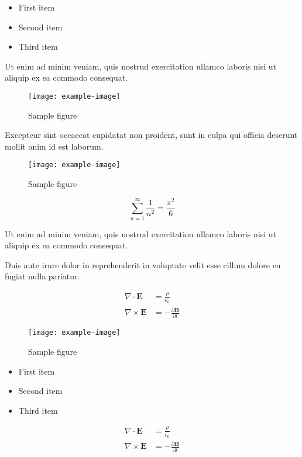 \documentclass{article}
\begin{document}
\begin{itemize}
\item First item
\item Second item
\item Third item
\end{itemize}

Ut enim ad minim veniam, quis nostrud exercitation ullamco laboris nisi ut aliquip ex ea commodo consequat.

\begin{figure}[h]
    \centering
    \texttt{[image: example-image]}
    \caption{Sample figure}
    \label{fig:sample}
\end{figure}

Excepteur sint occaecat cupidatat non proident, sunt in culpa qui officia deserunt mollit anim id est laborum.

\begin{figure}[h]
    \centering
    \texttt{[image: example-image]}
    \caption{Sample figure}
    \label{fig:sample}
\end{figure}

\begin{equation}
    \sum_{n=1}^{\infty} \frac{1}{n^2} = \frac{\pi^2}{6}
\end{equation}

Ut enim ad minim veniam, quis nostrud exercitation ullamco laboris nisi ut aliquip ex ea commodo consequat.

Duis aute irure dolor in reprehenderit in voluptate velit esse cillum dolore eu fugiat nulla pariatur.

\begin{align}
    \nabla \cdot \mathbf{E} &= \frac{\rho}{\epsilon_0} \\
    \nabla \times \mathbf{E} &= -\frac{\partial \mathbf{B}}{\partial t}
\end{align}

\begin{figure}[h]
    \centering
    \texttt{[image: example-image]}
    \caption{Sample figure}
    \label{fig:sample}
\end{figure}


\begin{itemize}
\item First item
\item Second item
\item Third item
\end{itemize}

\begin{align}
    \nabla \cdot \mathbf{E} &= \frac{\rho}{\epsilon_0} \\
    \nabla \times \mathbf{E} &= -\frac{\partial \mathbf{B}}{\partial t}
\end{align}
\end{document}
